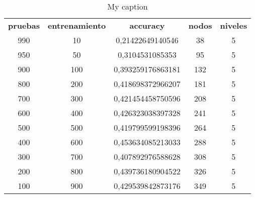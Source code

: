 \begin{table}[h]
	\centering
	\caption{My caption}
	\label{my-label}
	\begin{tabular}{ccccc}
		\textbf{pruebas} & \textbf{entrenamiento} & \textbf{accuracy} & \textbf{nodos} & \textbf{niveles} \\
		990              & 10                     & 0,21422649140546  & 38             & 5                \\
		950              & 50                     & 0,3104531085353   & 95             & 5                \\
		900              & 100                    & 0,393259176863181 & 132            & 5                \\
		800              & 200                    & 0,418698372966207 & 181            & 5                \\
		700              & 300                    & 0,421454458750596 & 208            & 5                \\
		600              & 400                    & 0,426323038397328 & 241            & 5                \\
		500              & 500                    & 0,419799599198396 & 264            & 5                \\
		400              & 600                    & 0,453634085213033 & 288            & 5                \\
		300              & 700                    & 0,407892976588628 & 308            & 5                \\
		200              & 800                    & 0,439736180904522 & 326            & 5                \\
		100              & 900                    & 0,429539842873176 & 349            & 5               
	\end{tabular}
\end{table}

\begin{table}[]
	\centering

	\label{my-label}
	\caption{My caption}
\end{table}

